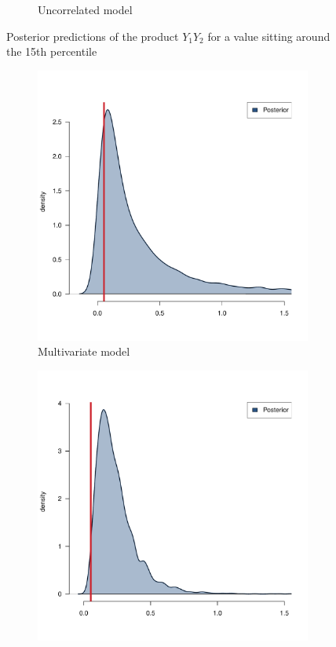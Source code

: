 \begin{figure}[htb]
\begin{subfigure}{0.4\textwidth}
		\caption{Uncorrelated model}
		\label{fig:cdiagram}
	\end{subfigure}
	\caption{Posterior predictions of the product \( Y_1 Y_2 \) for a value sitting around the 15\textup{th} percentile}
	\label{fig::res-params}
\end{figure}


\begin{figure}[htb]
	\centering
	\begin{subfigure}{0.4\textwidth}
		\includegraphics{./Figures/15th-percentile_corr.pdf}
		\caption{Multivariate model}
		\label{fig:capparatus}
	\end{subfigure}
	\hfil
	\begin{subfigure}{0.4\textwidth}
		\includegraphics{./Figures/15th-percentile_uncorr.pdf}

\end{subfigure}
\end{figure}

